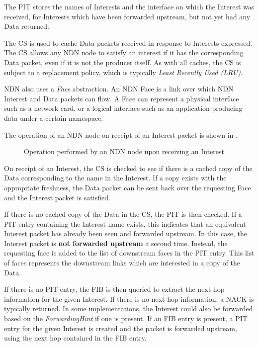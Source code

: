 The PIT stores the names of Interests and the interface on which the Interest was received, for Interests which have been forwarded upstream, but not yet had any Data returned.

The CS is used to cache Data packets received in response to Interests expressed. The CS allows any NDN node to satisfy an interest if it has the corresponding Data packet, even if it is not the producer itself. As with all caches, the CS is subject to a replacement policy, which is typically \textit{Least Recently Used (LRU)}.

NDN also uses a \textit{Face} abstraction. An NDN Face is a link over which NDN Interest and Data packets can flow. A Face can represent a physical interface such as a network card, or a logical interface such as an application producing data under a certain namespace.


The operation of an NDN node on receipt of an Interest packet is shown in .  

\begin{figure}[H]
    \centering
    \caption{Operation performed by an NDN node upon receiving an Interest}
    \label{fig:ndn-on-interest}
\end{figure}

On receipt of an Interest, the CS is checked to see if there is a cached copy of the Data corresponding to the name in the Interest. If a copy exists with the appropriate freshness, the Data packet can be sent back over the requesting Face and the Interest packet is satisfied. 

If there is no cached copy of the Data in the CS, the PIT is then checked. If a PIT entry containing the Interest name exists, this indicates that an equivalent Interest packet has already been seen and forwarded upstream. In this case, the Interest packet is \textbf{not forwarded upstream} a second time. Instead, the requesting face is added to the list of downstream faces in the PIT entry. This list of faces represents the downstream links which are interested in a copy of the Data.

If there is no PIT entry, the FIB is then queried to extract the next hop information for the given Interest. If there is no next hop information, a NACK is typically returned. In some implementations, the Interest could also be forwarded based on the \textit{ForwardingHint} if one is present. If an FIB entry is present, a PIT entry for the given Interest is created and the packet is forwarded upstream, using the next hop contained in the FIB entry. 

